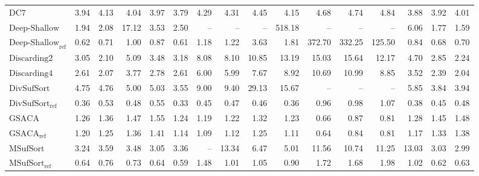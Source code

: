 \begin{table}
{\begin{tabular}{lrrrrrrrrrrrrrrr}
    $\text{DC7}$ & 3.94 & 4.13 & 4.04 & 3.97 & 3.79 & 4.29 & 4.31 & 4.45 & 4.15 & 4.68 & 4.74 & 4.84 & 3.88 & 3.92 & 4.01 \\
    $\text{Deep-Shallow}$ & 1.94 & 2.08 & {\color{red}17.12} & 3.53 & 2.50 & {\color{darkgray}--} & {\color{darkgray}--} & {\color{darkgray}--} & {\color{red}518.18} & {\color{darkgray}--} & {\color{darkgray}--} & {\color{darkgray}--} & 6.06 & 1.77 & 1.59 \\
    $\text{Deep-Shallow}_{\text{ref}}$ & 0.62 & 0.71 & 1.00 & 0.87 & 0.61 & 1.18 & 1.22 & 3.63 & 1.81 & {\color{red}372.70} & {\color{red}332.25} & {\color{red}125.50} & 0.84 & 0.68 & 0.70 \\
    $\text{Discarding2}$ & 3.05 & 2.10 & 5.09 & 3.48 & 3.18 & {\color{red}8.08} & 8.10 & 10.85 & 13.19 & {\color{red}15.03} & {\color{red}15.64} & {\color{red}12.17} & 4.70 & 2.85 & 2.24 \\
    $\text{Discarding4}$ & 2.61 & 2.07 & 3.77 & 2.78 & 2.61 & 6.00 & 5.99 & 7.67 & 8.92 & 10.69 & 10.99 & 8.85 & 3.52 & 2.39 & 2.04 \\
    $\text{DivSufSort}$ & {\color{red}4.75} & {\color{red}4.76} & 5.00 & 5.03 & 3.55 & {\color{red}9.00} & {\color{red}9.40} & {\color{red}29.13} & {\color{red}15.67} & {\color{darkgray}--} & {\color{darkgray}--} & {\color{darkgray}--} & 5.85 & 3.84 & 3.94 \\
    $\text{DivSufSort}_{\text{ref}}$ & {\color{green!60!black}0.36} & {\color{green!60!black}0.53} & {\color{green!60!black}0.48} & {\color{green!60!black}0.55} & {\color{green!60!black}0.33} & {\color{green!60!black}0.45} & {\color{green!60!black}0.47} & {\color{green!60!black}0.46} & {\color{green!60!black}0.36} & 0.96 & 0.98 & 1.07 & {\color{green!60!black}0.38} & {\color{green!60!black}0.45} & {\color{green!60!black}0.48} \\
    $\text{GSACA}$ & 1.26 & 1.36 & 1.47 & 1.55 & 1.24 & 1.19 & 1.22 & 1.32 & 1.23 & {\color{green!60!black}0.66} & {\color{green!60!black}0.87} & {\color{green!60!black}0.81} & 1.28 & 1.45 & 1.48 \\
    $\text{GSACA}_{\text{ref}}$ & 1.20 & 1.25 & 1.36 & 1.41 & 1.14 & 1.09 & 1.12 & 1.25 & 1.11 & {\color{green!60!black}0.64} & {\color{green!60!black}0.84} & {\color{green!60!black}0.81} & 1.17 & 1.33 & 1.38 \\
    $\text{MSufSort}$ & 3.24 & 3.59 & 3.48 & 3.05 & 3.36 & {\color{darkgray}--} & {\color{red}13.34} & 6.47 & 5.01 & {\color{red}11.56} & 10.74 & 11.25 & {\color{red}13.03} & 3.03 & 2.99 \\
    $\text{MSufSort}_{\text{ref}}$ & 0.64 & 0.76 & 0.73 & 0.64 & 0.59 & 1.48 & 1.01 & 1.05 & 0.90 & 1.72 & 1.68 & 1.98 & 1.02 & 0.62 & 0.63 \\

\end{tabular}}
\end{table}
